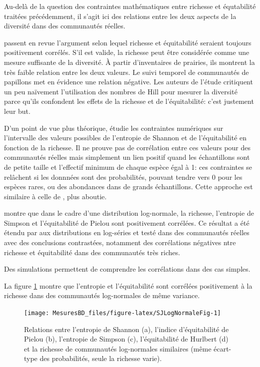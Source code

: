 \documentclass[
  11pt,
  french,
  a4paper,
  extrafontsizes,onecolumn,openright
  ]{memoir}
\begin{document}
Au-delà de la question des contraintes mathématiques entre richesse et équtabilité traitées précédemment, il s'agit ici des relations entre les deux aspects de la diversité dans des communautés réelles.

\textcite{Wilsey2005} passent en revue l'argument selon lequel richesse et équitabilité seraient toujours positivement corrélés.
S'il est valide, la richesse peut être considérée comme une mesure suffisante de la diversité.
À partir d'inventaires de prairies, ils montrent la très faible relation entre les deux valeurs.
Le suivi temporel de communautés de papillons \autocite{MacDonald2016} met en évidence une relation négative.
Les auteurs de l'étude critiquent un peu naïvement l'utilisation des nombres de Hill pour mesurer la diversité parce qu'ils confondent les effets de la richesse et de l'équitabilité: c'est justement leur but.

D'un point de vue plus théorique, \textcite{DeBenedictis1973} étudie les contraintes numériques sur l'intervalle des valeurs possibles de l'entropie de Shannon et de l'équitabilité en fonction de la richesse.
Il ne prouve pas de corrélation entre ces valeurs pour des communautés réelles mais simplement un lien positif quand les échantillons sont de petite taille et l'effectif minimum de chaque espèce égal à 1: ces contraintes se relâchent si les donnnées sont des probabilités, pouvant tendre vers 0 pour les espèces rares, ou des abondances dans de grands échantillons.
Cette approche est similaire à celle de \textcite{Jost2010}, plus aboutie.

\textcite{May1975} montre que dans le cadre d'une distribution log-normale, la richesse, l'entropie de Simpson et l'équitabilité de Pielou sont positivement corrélées.
Ce résultat a été étendu par \textcite{Stirling2001} aux distributions en log-séries et testé dans des communautés réelles avec des conclusions contrastées, notamment des corrélations négatives ntre richesse et équitabilité dans des communautés très riches.

Des simulations permettent de comprendre les corrélations dans des cas simples.

La figure \ref{fig:SJLogNormaleFig} montre que l'entropie et l'équitabilité sont corrélées positivement à la richesse dans des communautés log-normales de même variance.



\scriptsize

\begin{figure}

{\centering \texttt{[image: MesuresBD\_files/figure-latex/SJLogNormaleFig-1]} 

}

\caption{Relations entre l'entropie de Shannon (a), l'indice d'équitabilité de Pielou (b), l'entropie de Simpson (c), l'équitabilité de Hurlbert (d) et la richesse de communautés log-normales similaires (même écart-type des probabilités, seule la richesse varie).}\label{fig:SJLogNormaleFig}
\end{figure}
\end{document}

